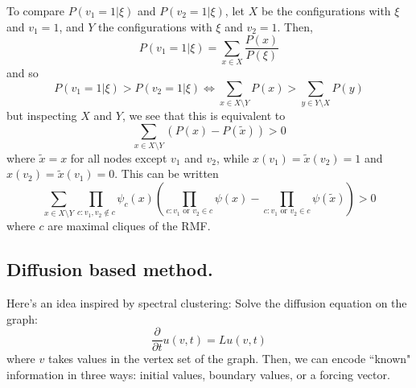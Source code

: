 \documentclass[10pt]{article}
\theoremstyle{definition}
\numberwithin{theorem}{section}
\numberwithin{definition}{section}
\numberwithin{lemma}{section}
\numberwithin{corollary}{section}
\numberwithin{clm}{section}
\numberwithin{rmk}{section}
\begin{document}
To compare $P(v_1 =1 | \xi)$ and $P(v_2 = 1 | \xi)$, let $X$ be the configurations with $\xi$ and $v_1 = 1$, and $Y$ the configurations with $\xi$ and $v_2 = 1$. Then,
\[
P(v_1 = 1| \xi) = \sum_{x\in X} \frac{P(x)}{P(\xi)}
\]
and so
\[
P(v_1 = 1| \xi) > P(v_2 = 1|\xi) \Leftrightarrow \sum_{x\in X\setminus Y} P(x) >\sum_{y \in Y\setminus X} P(y)
\]
but inspecting $X$ and $Y$, we see that this is equivalent to 
\[
\sum_{x\in X\setminus Y} (P(x) - P(\tilde{x})) > 0
\]
where $\tilde{x} = x$ for all nodes except $v_1$ and $v_2$, while $x(v_1) = \tilde{x}(v_2) = 1$ and $x(v_2) = \tilde{x}(v_1) = 0$. This can be written
\begin{equation}
\sum_{x\in X\setminus Y}\prod_{c:v_1,v_2 \not \in c}\psi_c(x)\left(\prod_{c:v_1\text{ or }v_2  \in c}\psi(x) - \prod_{c:v_1\text{ or }v_2  \in c}\psi(\tilde{x}) \right) >0
\end{equation}
where $c$ are maximal cliques of the RMF.


\subsection{Diffusion based method.}
Here's an idea inspired by spectral clustering: Solve the diffusion equation on the graph:
\[
\frac{\partial}{\partial t} u(v,t) = L u(v,t)
\]
where $v$ takes values in the vertex set of the graph. Then, we can encode ``known" information in three ways: initial values, boundary values, or a forcing vector.
\end{document}
